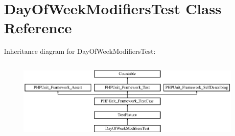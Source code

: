 \section{Day\+Of\+Week\+Modifiers\+Test Class Reference}
\label{class_day_of_week_modifiers_test}
Inheritance diagram for Day\+Of\+Week\+Modifiers\+Test\+:\begin{figure}[H]
\begin{center}
\leavevmode
\includegraphics[height=4.129793cm]{class_day_of_week_modifiers_test}
\end{center}
\end{figure}
